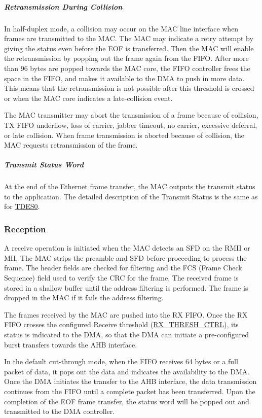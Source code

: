 \documentclass[main\_\_EN.tex]{subfiles}
\begin{document}
\subparagraph{Retransmission During Collision}
\label{sec:ethernetmac-retrans-dur-collision}
In half-duplex mode, a collision may occur on the MAC line interface when frames are transmitted to the MAC. The MAC may indicate a retry attempt by giving the status even before the EOF is transferred. Then the MAC will enable the retransmission by popping out the frame again from the FIFO. After more than 96 bytes are popped towards the MAC core, the FIFO controller frees the space in the FIFO, and makes it available to the DMA to push in more data. This means that the retransmission is not possible after this threshold is crossed or when the MAC core indicates a late-collision event.

The MAC transmitter may abort the transmission of a frame because of collision, TX FIFO underflow, loss of carrier, jabber timeout, no carrier, excessive deferral, or late collision. When frame transmission is aborted because of collision, the MAC requests retransmission of the frame.

\subparagraph{Transmit Status Word}
At the end of the Ethernet frame transfer, the MAC outputs the transmit status to the application. The detailed description of the Transmit Status is the same as for \hyperref[tab:ethernetmac-TDES0]{TDES0}.

\subsubsection{Reception}
A receive operation is initiated when the MAC detects an SFD on the RMII or MII. The MAC strips the preamble and SFD before proceeding to process the frame. The header fields are checked for filtering and the FCS (Frame Check Sequence) field used to verify the CRC for the frame. The received frame is stored in a shallow buffer until the address filtering is performed. The frame is dropped in the MAC if it fails the address filtering.

The frames received by the MAC are pushed into the RX FIFO. Once the RX FIFO crosses the configured Receive threshold (\hyperref[regdesc:DMAOPERATIONMODEREG]{RX\_THRESH\_CTRL}), its status is indicated to the DMA, so that the DMA can initiate a pre-configured burst transfers towards the AHB interface.

In the default cut-through mode, when the FIFO receives 64 bytes or a full packet of data, it pops out the data and indicates the availability to the DMA. Once the DMA initiates the transfer to the AHB interface, the data transmission continues from the FIFO until a complete packet has been transferred. Upon the completion of the EOF frame transfer, the status word will be popped out and transmitted to the DMA controller.
\end{document}

